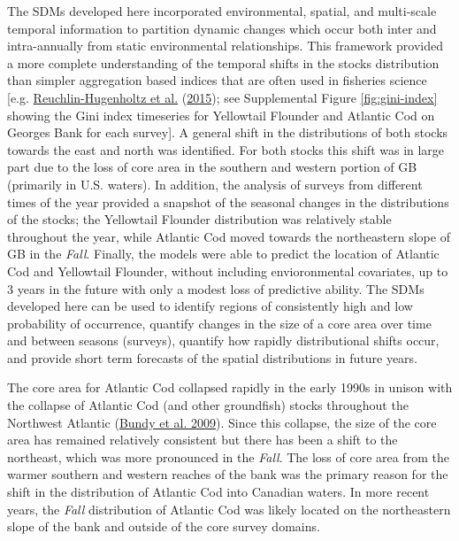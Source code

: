 \documentclass[
]{article}
\begin{document}
The SDMs developed here incorporated environmental, spatial, and multi-scale temporal information to partition dynamic changes which occur both inter and intra-annually from static environmental relationships. This framework provided a more complete understanding of the temporal shifts in the stocks distribution than simpler aggregation based indices that are often used in fisheries science {[}e.g. \protect\hyperlink{ref-reuchlin-hugenholtzPotentialSpatialDistribution2015}{Reuchlin-Hugenholtz et al.} (\protect\hyperlink{ref-reuchlin-hugenholtzPotentialSpatialDistribution2015}{2015}); see Supplemental Figure \ref{fig:gini-index} showing the Gini index timeseries for Yellowtail Flounder and Atlantic Cod on Georges Bank for each survey{]}. A general shift in the distributions of both stocks towards the east and north was identified. For both stocks this shift was in large part due to the loss of core area in the southern and western portion of GB (primarily in U.S. waters). In addition, the analysis of surveys from different times of the year provided a snapshot of the seasonal changes in the distributions of the stocks; the Yellowtail Flounder distribution was relatively stable throughout the year, while Atlantic Cod moved towards the northeastern slope of GB in the \emph{Fall}. Finally, the models were able to predict the location of Atlantic Cod and Yellowtail Flounder, without including envioronmental covariates, up to 3 years in the future with only a modest loss of predictive ability. The SDMs developed here can be used to identify regions of consistently high and low probability of occurrence, quantify changes in the size of a core area over time and between seasons (surveys), quantify how rapidly distributional shifts occur, and provide short term forecasts of the spatial distributions in future years.

The core area for Atlantic Cod collapsed rapidly in the early 1990s in unison with the collapse of Atlantic Cod (and other groundfish) stocks throughout the Northwest Atlantic (\protect\hyperlink{ref-bundySealsCodForage2009}{Bundy et al. 2009}). Since this collapse, the size of the core area has remained relatively consistent but there has been a shift to the northeast, which was more pronounced in the \emph{Fall}. The loss of core area from the warmer southern and western reaches of the bank was the primary reason for the shift in the distribution of Atlantic Cod into Canadian waters. In more recent years, the \emph{Fall} distribution of Atlantic Cod was likely located on the northeastern slope of the bank and outside of the core survey domains.
\end{document}
